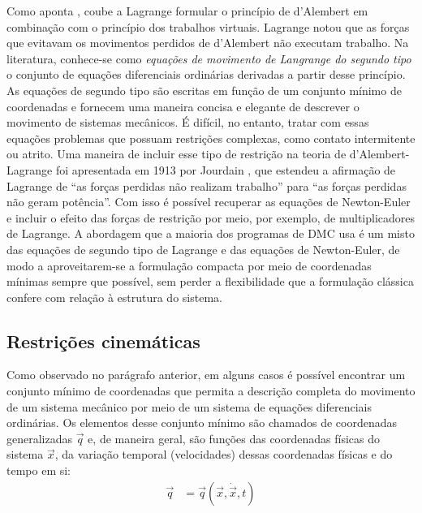 Como aponta , coube a Lagrange formular o princípio de d'Alembert em combinação com o princípio dos trabalhos virtuais. Lagrange notou que as forças que evitavam os movimentos perdidos de d'Alembert não executam trabalho. Na literatura, conhece-se como \textit{equações de movimento de Langrange do segundo tipo} \cite{schiehlen_multibody_1997,pfeiffer_mechanical_2005, woernle_mehrkorpersysteme_2011} o conjunto de equações diferenciais ordinárias derivadas a partir desse princípio. As equações de segundo tipo são escritas em função de um conjunto mínimo de coordenadas e fornecem uma maneira concisa e elegante de descrever o movimento de sistemas mecânicos. É difícil, no entanto, tratar com essas equações problemas que possuam restrições complexas, como contato intermitente ou atrito. Uma maneira de incluir esse tipo de restrição na teoria de d'Alembert-Lagrange foi apresentada em 1913 por Jourdain \cite{schiehlen_multibody_1997}, que estendeu a afirmação de Lagrange de ``as forças perdidas não realizam trabalho'' para 
``as forças perdidas não geram potência''. Com isso é possível recuperar as equações de Newton-Euler e incluir o efeito das forças de restrição por meio, por exemplo, de 
multiplicadores de Lagrange. A abordagem que a maioria dos programas de DMC usa é um misto das equações de segundo tipo de Lagrange e das equações de Newton-Euler, de modo a aproveitarem-se a formulação compacta por meio de coordenadas mínimas sempre que possível, sem perder a flexibilidade que a formulação clássica confere com relação à estrutura do sistema.

\subsection{Restrições cinemáticas\label{sec: sistemas_restritos}}
Como observado no parágrafo anterior, em alguns casos é possível encontrar um
conjunto mínimo de coordenadas que permita a descrição completa do movimento de
um sistema mecânico por meio de um sistema de equações diferenciais ordinárias.
Os elementos desse conjunto mínimo são chamados de coordenadas generalizadas
$\vec{q}$ e, de
maneira geral, são funções das coordenadas físicas do sistema $\vec{x}$, da
variação temporal (velocidades) dessas coordenadas físicas e do tempo em si:
\begin{align}
 \vec{q} &= \vec{q}(\vec{x},\dot{\vec{x}},t)
\end{align}

